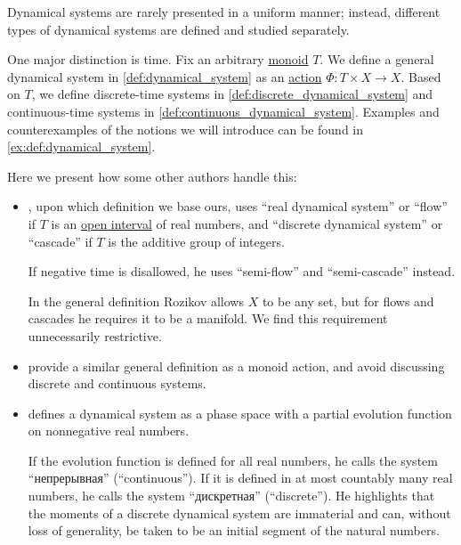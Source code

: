 \begin{remark}\label{rem:dynamical_system_time_etymology}
  Dynamical systems are rarely presented in a uniform manner; instead, different types of dynamical systems are defined and studied separately.

  One major distinction is time. Fix an arbitrary \hyperref[def:monoid]{monoid} \( T \). We define a general dynamical system in \cref{def:dynamical_system} as an \hyperref[def:monoid_action]{action} \( \Phi: T \times X \to X \). Based on \( T \), we define discrete-time systems in \cref{def:discrete_dynamical_system} and continuous-time systems in \cref{def:continuous_dynamical_system}. Examples and counterexamples of the notions we will introduce can be found in \cref{ex:def:dynamical_system}.

  Here we present how some other authors handle this:
  \begin{itemize}
    \item {}, upon which definition we base ours, uses \enquote{real dynamical system} or \enquote{flow} if \( T \) is an \hyperref[def:order_interval/open]{open interval} of real numbers, and \enquote{discrete dynamical system} or \enquote{cascade} if \( T \) is the additive group of integers.

    If negative time is disallowed, he uses \enquote{semi-flow} and \enquote{semi-cascade} instead.

    In the general definition Rozikov allows \( X \) to be any set, but for flows and cascades he requires it to be a manifold. We find this requirement unnecessarily restrictive.

    \item {} provide a similar general definition as a monoid action, and avoid discussing discrete and continuous systems.

    \item {} defines a dynamical system as a phase space with a partial evolution function on nonnegative real numbers.

    If the evolution function is defined for all real numbers, he calls the system \enquote{непрерывная} (\enquote{continuous}). If it is defined in at most countably many real numbers, he calls the system \enquote{дискретная} (\enquote{discrete}). He highlights that the moments of a discrete dynamical system are immaterial and can, without loss of generality, be taken to be an initial segment of the natural numbers.


\end{itemize}
\end{remark}
